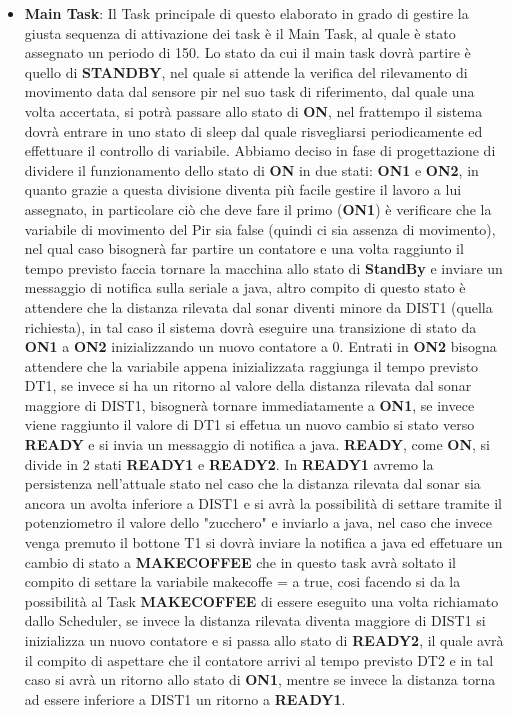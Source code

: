 \documentclass[a4paper]{article}
\begin{document}
\begin{itemize}
\item \textbf{Main Task}:
Il Task principale di questo elaborato in grado di gestire la giusta sequenza di attivazione dei task è il Main Task, al quale è stato assegnato un periodo di 150.
Lo stato da cui il main task dovrà partire è quello di \textbf{STANDBY}, nel quale si attende la verifica del rilevamento di movimento data dal sensore pir nel suo task di riferimento, dal quale una volta accertata, si potrà passare allo stato di \textbf{ON}, nel frattempo il sistema dovrà entrare in uno stato di sleep dal quale risvegliarsi periodicamente ed effettuare il controllo di variabile.
Abbiamo deciso in fase di progettazione di dividere il funzionamento dello stato di \textbf{ON} in due stati: \textbf{ON1} e \textbf{ON2}, in quanto grazie a questa divisione diventa più facile gestire il lavoro a lui assegnato, in particolare ciò che deve fare il primo (\textbf{ON1}) è verificare che la variabile di movimento del Pir sia false (quindi ci sia assenza di movimento), nel qual caso bisognerà far partire un contatore e una volta raggiunto il tempo previsto faccia tornare la macchina allo stato di \textbf{StandBy} e inviare un messaggio di notifica sulla seriale a java, altro compito di questo stato è attendere che la distanza rilevata dal sonar diventi minore da DIST1 (quella richiesta), in tal caso il sistema dovrà eseguire una transizione di stato da \textbf{ON1} a \textbf{ON2} inizializzando un nuovo contatore a 0.
Entrati in \textbf{ON2} bisogna attendere che la variabile appena inizializzata raggiunga il tempo previsto DT1, se invece si ha un ritorno al valore della distanza rilevata dal sonar maggiore di DIST1, bisognerà tornare immediatamente a \textbf{ON1}, se invece viene raggiunto il valore di DT1 si effetua un nuovo cambio si stato verso \textbf{READY} e si invia un messaggio di notifica a java.
\textbf{READY}, come \textbf{ON}, si divide in 2 stati \textbf{READY1} e \textbf{READY2}. In \textbf{READY1} avremo la persistenza nell'attuale stato nel caso che la distanza rilevata dal sonar sia ancora un avolta inferiore a DIST1 e si avrà la possibilità di settare tramite il potenziometro il valore dello "zucchero" e inviarlo a java, nel caso che invece venga premuto il bottone T1 si dovrà inviare la notifica a java ed effetuare un cambio di stato a \textbf{MAKECOFFEE} che in questo task avrà soltato il compito di settare la variabile makecoffe = a true, cosi facendo si da la possibilità al Task \textbf{MAKECOFFEE} di essere eseguito una volta richiamato dallo Scheduler, se invece la distanza rilevata diventa maggiore di DIST1 si inizializza un nuovo contatore e si passa allo stato di \textbf{READY2}, il quale avrà il compito di aspettare che il contatore arrivi al tempo previsto DT2 e in tal caso si avrà un ritorno allo stato di \textbf{ON1}, mentre se invece la distanza torna ad essere inferiore a DIST1 un ritorno a \textbf{READY1}.

\end{itemize}
\end{document}
